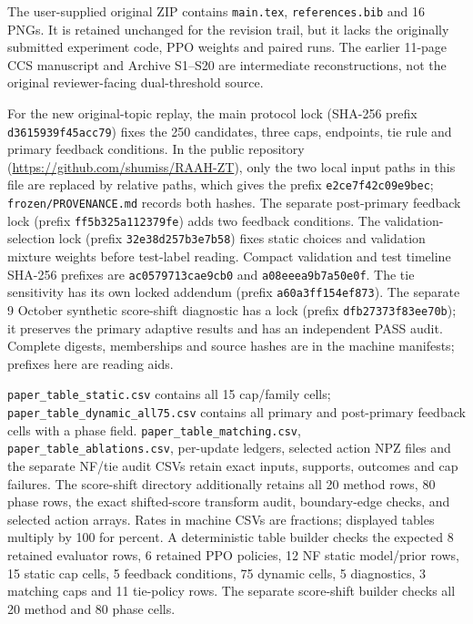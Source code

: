 \documentclass[10pt,onecolumn]{IEEEtran}
\begin{document}
The user-supplied original ZIP contains
\texttt{main.tex}, \texttt{references.bib}
and 16 PNGs. It is retained unchanged
for the revision trail, but it lacks
the originally submitted experiment
code, PPO weights and paired runs.
The earlier 11-page CCS manuscript
and Archive S1--S20 are intermediate
reconstructions, not the original
reviewer-facing dual-threshold source.

For the new original-topic replay,
the main protocol lock (SHA-256 prefix
\texttt{d3615939f45acc79}) fixes the
250 candidates, three caps, endpoints,
tie rule and primary feedback conditions.
In the public repository
(\url{https://github.com/shumiss/RAAH-ZT}),
only the two local input paths in this
file are replaced by relative paths,
which gives the prefix
\texttt{e2ce7f42c09e9bec};
\texttt{frozen/PROVENANCE.md} records
both hashes.
The separate post-primary feedback lock
(prefix \texttt{ff5b325a112379fe})
adds two feedback conditions.
The validation-selection lock
(prefix \texttt{32e38d257b3e7b58})
fixes static choices and validation
mixture weights before test-label reading.
Compact validation and test timeline
SHA-256 prefixes are
\texttt{ac0579713cae9cb0} and
\texttt{a08eeea9b7a50e0f}.
The tie sensitivity has its own
locked addendum (prefix
\texttt{a60a3ff154ef873}).
The separate 9 October synthetic
score-shift diagnostic has a lock
(prefix \texttt{dfb27373f83ee70b});
it preserves the primary adaptive
results and has an independent
PASS audit.
Complete digests, memberships and
source hashes are in the machine
manifests; prefixes here are reading aids.

\texttt{paper\_table\_static.csv}
contains all 15 cap/family cells;
\texttt{paper\_table\_dynamic\_all75.csv}
contains all primary and post-primary
feedback cells with a phase field.
\texttt{paper\_table\_matching.csv},
\texttt{paper\_table\_ablations.csv},
per-update ledgers, selected action
NPZ files and the separate NF/tie
audit CSVs retain exact inputs,
supports, outcomes and cap failures.
The score-shift directory additionally
retains all 20 method rows,
80 phase rows, the exact shifted-score
transform audit, boundary-edge checks,
and selected action arrays.
Rates in machine CSVs are fractions;
displayed tables multiply by 100
for percent. A deterministic table
builder checks the expected 8 retained
evaluator rows, 6 retained PPO policies,
12 NF static model/prior rows,
15 static cap cells, 5 feedback conditions,
75 dynamic cells, 5 diagnostics,
3 matching caps and 11 tie-policy rows.
The separate score-shift builder checks
all 20 method and 80 phase cells.
\end{document}

